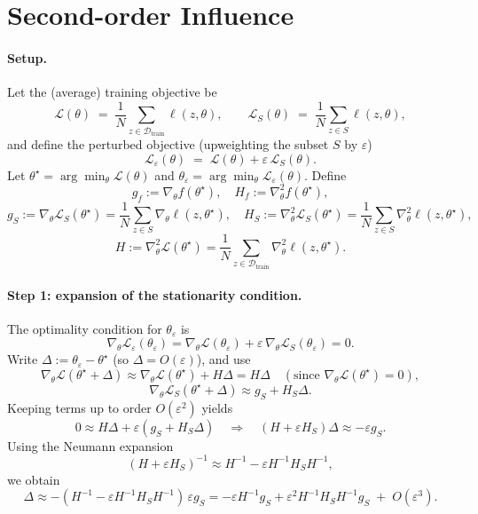 \documentclass{article}
\theoremstyle{plain}
\theoremstyle{definition}
\theoremstyle{remark}
\begin{document}

\begin{abstract}
\end{abstract}



\section{Second-order Influence}

\paragraph{Setup.}
Let the (average) training objective be
\[
\mathcal{L}(\theta) \;=\; \frac{1}{N}\sum_{z\in \mathcal{D}_{\mathrm{train}}}\ell(z,\theta),
\qquad
\mathcal{L}_S(\theta) \;=\; \frac{1}{N}\sum_{z\in S}\ell(z,\theta),
\]
and define the perturbed objective (upweighting the subset $S$ by $\varepsilon$)
\[
\mathcal{L}_\varepsilon(\theta)\;=\;\mathcal{L}(\theta)+\varepsilon\,\mathcal{L}_S(\theta).
\]
Let $\theta^\star=\arg\min_\theta \mathcal{L}(\theta)$ and $\theta_\varepsilon=\arg\min_\theta \mathcal{L}_\varepsilon(\theta)$.
Define
\[
g_f := \nabla_\theta f(\theta^\star),\quad H_f:=\nabla_\theta^2 f(\theta^\star),
\]
\[
g_S := \nabla_\theta \mathcal{L}_S(\theta^\star)=\frac{1}{N}\sum_{z\in S}\nabla_\theta \ell(z,\theta^\star),\quad
H_S := \nabla_\theta^2 \mathcal{L}_S(\theta^\star)=\frac{1}{N}\sum_{z\in S}\nabla_\theta^2 \ell(z,\theta^\star),
\]
\[
H := \nabla_\theta^2 \mathcal{L}(\theta^\star)=\frac{1}{N}\sum_{z\in \mathcal{D}_{\mathrm{train}}}\nabla_\theta^2 \ell(z,\theta^\star).
\]

\paragraph{Step 1: expansion of the stationarity condition.}
The optimality condition for $\theta_\varepsilon$ is
\[
\nabla_\theta \mathcal{L}_\varepsilon(\theta_\varepsilon)
=\nabla_\theta\mathcal{L}(\theta_\varepsilon)+\varepsilon\,\nabla_\theta\mathcal{L}_S(\theta_\varepsilon)=0.
\]
Write $\Delta := \theta_\varepsilon-\theta^\star$ (so $\Delta=O(\varepsilon)$), and use
\[
\nabla_\theta\mathcal{L}(\theta^\star+\Delta)\approx \nabla_\theta\mathcal{L}(\theta^\star)+H\Delta
=H\Delta
\quad(\text{since }\nabla_\theta\mathcal{L}(\theta^\star)=0),
\]
\[
\nabla_\theta\mathcal{L}_S(\theta^\star+\Delta)\approx g_S+H_S\Delta.
\]
Keeping terms up to order $O(\varepsilon^2)$ yields
\[
0 \approx H\Delta + \varepsilon(g_S+H_S\Delta)
\quad\Longrightarrow\quad
(H+\varepsilon H_S)\Delta \approx -\varepsilon g_S.
\]
Using the Neumann expansion
\[
(H+\varepsilon H_S)^{-1}\approx H^{-1}-\varepsilon H^{-1}H_S H^{-1},
\]
we obtain
\[
\Delta
\approx -(H^{-1}-\varepsilon H^{-1}H_S H^{-1})\,\varepsilon g_S
= -\varepsilon H^{-1}g_S + \varepsilon^2 H^{-1}H_S H^{-1}g_S
\;+\;O(\varepsilon^3).
\]
\end{document}
